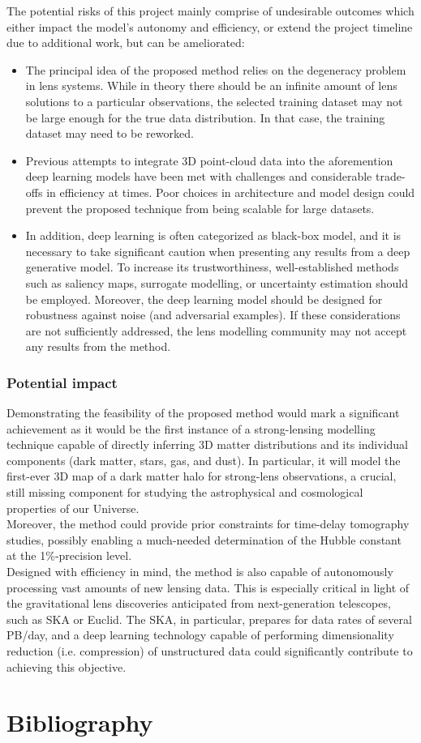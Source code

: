 \documentclass[a4paper,10pt]{article}
\begin{document}
The potential risks of this project mainly comprise of undesirable
outcomes which either impact the model's autonomy and efficiency, or
extend the project timeline due to additional work, but can be
ameliorated:
\begin{itemize}[leftmargin=*, noitemsep]
\item The principal idea of the proposed method relies on the degeneracy
problem in lens systems. While in theory there should be an infinite
amount of lens solutions to a particular observations, the selected
training dataset may not be large enough for the true data
distribution. In that case, the training dataset may need to be
reworked.
\item Previous attempts to integrate 3D point-cloud data into the
aforemention deep learning models have been met with challenges and
considerable trade-offs in efficiency at times. Poor choices in
architecture and model design could prevent the proposed technique
from being scalable for large datasets.
\item In addition, deep learning is often categorized as black-box model,
and it is necessary to take significant caution when presenting any
results from a deep generative model. To increase its trustworthiness,
well-established methods such as saliency maps, surrogate modelling,
or uncertainty estimation should be employed. Moreover, the deep
learning model should be designed for robustness against noise (and
adversarial examples). If these considerations are not sufficiently
addressed, the lens modelling community may not accept any results
from the method.
\end{itemize}

\subsubsection{Potential impact}
\label{sec:org1753a4b}

Demonstrating the feasibility of the proposed method would mark a
significant achievement as it would be the first instance of a
strong-lensing modelling technique capable of directly inferring 3D
matter distributions and its individual components (dark matter,
stars, gas, and dust).  In particular, it will model the first-ever 3D
map of a dark matter halo for strong-lens observations, a crucial,
still missing component for studying the astrophysical and
cosmological properties of our Universe. \\[0pt]
Moreover, the method could provide prior constraints for time-delay
tomography studies, possibly enabling a much-needed determination of
the Hubble constant at the 1\%-precision level. \\[0pt]
Designed with efficiency in mind, the method is also capable of
autonomously processing vast amounts of new lensing data. This is
especially critical in light of the gravitational lens discoveries
anticipated from next-generation telescopes, such as SKA or
Euclid. The SKA, in particular, prepares for data rates of several
PB/day, and a deep learning technology capable of performing
dimensionality reduction (i.e. compression) of unstructured data could
significantly contribute to achieving this objective.


\newpage
\section{Bibliography}
\label{sec:orga4b74a7}



\end{document}

